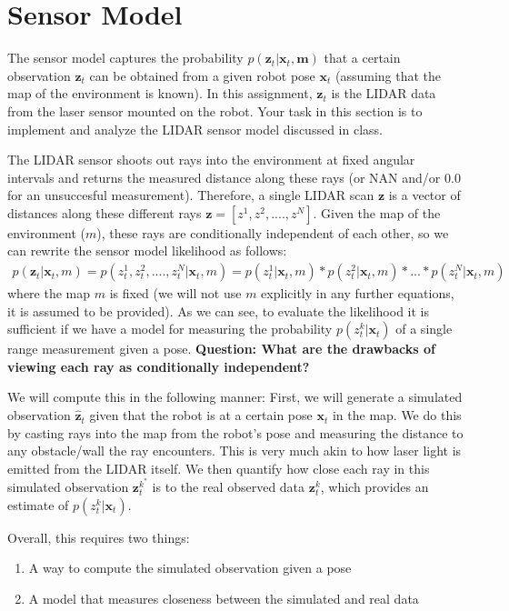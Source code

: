 \documentclass[final]{article}
\begin{document}
\section{Sensor Model}

The sensor model captures the probability $p(\mathbf{z}_t | \mathbf{x}_t,\mathbf{m})$ that a certain observation $\mathbf{z}_t$ can be obtained from a given robot pose $\mathbf{x}_t$ (assuming that the map of the environment is known). In this assignment, $\mathbf{z}_t$ is the LIDAR data from the laser sensor mounted on the robot. Your task in this section is to implement and analyze the LIDAR sensor model discussed in class.

The LIDAR sensor shoots out rays into the environment at fixed angular intervals and returns the measured distance along these rays (or NAN and/or 0.0 for an unsuccesful measurement). Therefore, a single LIDAR scan $\mathbf{z}$ is a vector of distances along these different rays $\mathbf{z} = \left[z^1, z^2, ...., z^N\right]$. Given the map of the environment ($m$), these rays are conditionally independent of each other, so we can rewrite the sensor model likelihood as follows:
\begin{align}
p(\mathbf{z}_t | \mathbf{x}_t, m) = p(z_t^1, z_t^2, ...., z_t^N | \mathbf{x}_t, m) = p(z_t^1 | \mathbf{x}_t, m) * p(z_t^2 | \mathbf{x}_t, m) * ... * p(z_t^N | \mathbf{x}_t ,m )
\end{align}
where the map $m$ is fixed (we will not use $m$ explicitly in any further equations, it is assumed to be provided). As we can see, to evaluate the likelihood it is sufficient if we have a model for measuring the probability $p(z_t^k | \mathbf{x}_t)$ of a single range measurement given a pose.\newline
\break
\textbf{Question: What are the drawbacks of viewing each ray as conditionally independent?}

We will compute this in the following manner: First, we will generate a simulated observation $\hat{\mathbf{z}}_t$ given that the robot is at a certain pose $\mathbf{x}_t$ in the map. We do this by casting rays into the map from the robot's pose and measuring the distance to any obstacle/wall the ray encounters. This is very much akin to how laser light is emitted from the LIDAR itself. We then quantify how close each ray in this simulated observation $\mathbf{z}_t^{k^*}$ is to the real observed data $\mathbf{z}^k_t$, which provides an estimate of $p(z_t^k | \mathbf{x}_t)$. 

Overall, this requires two things: 
\begin{enumerate}
\item A way to compute the simulated observation given a pose
\item A model that measures closeness between the simulated and real data
\end{enumerate}
\end{document}
